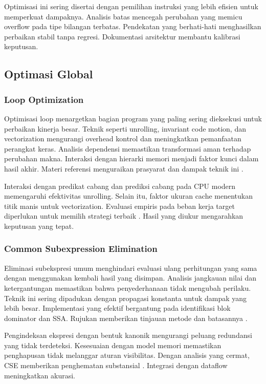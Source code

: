 \documentclass[../main.tex]{subfiles}
\begin{document}
Optimisasi ini sering disertai dengan pemilihan instruksi yang lebih efisien untuk memperkuat dampaknya. Analisis batas mencegah perubahan yang memicu overflow pada tipe bilangan terbatas. Pendekatan yang berhati-hati menghasilkan perbaikan stabil tanpa regresi. Dokumentasi arsitektur membantu kalibrasi keputusan.

\subsection{Optimasi Global}
\subsubsection{Loop Optimization}
Optimisasi loop menargetkan bagian program yang paling sering dieksekusi untuk perbaikan kinerja besar. Teknik seperti unrolling, invariant code motion, dan vectorization mengurangi overhead kontrol dan meningkatkan pemanfaatan perangkat keras. Analisis dependensi memastikan transformasi aman terhadap perubahan makna. Interaksi dengan hierarki memori menjadi faktor kunci dalam hasil akhir. Materi referensi menguraikan prasyarat dan dampak teknik ini \citep{WikiLoopOptimization}.

Interaksi dengan predikat cabang dan prediksi cabang pada CPU modern memengaruhi efektivitas unrolling. Selain itu, faktor ukuran cache menentukan titik manis untuk vectorization. Evaluasi empiris pada beban kerja target diperlukan untuk memilih strategi terbaik \citep{WikiLoopOptimization}. Hasil yang diukur mengarahkan keputusan yang tepat.

\subsubsection{Common Subexpression Elimination}
Eliminasi subekspresi umum menghindari evaluasi ulang perhitungan yang sama dengan menggunakan kembali hasil yang disimpan. Analisis jangkauan nilai dan ketergantungan memastikan bahwa penyederhanaan tidak mengubah perilaku. Teknik ini sering dipadukan dengan propagasi konstanta untuk dampak yang lebih besar. Implementasi yang efektif bergantung pada identifikasi blok dominator dan SSA. Rujukan memberikan tinjauan metode dan batasannya \citep{WikiCSE}.

Pengindeksan ekspresi dengan bentuk kanonik mengurangi peluang redundansi yang tidak terdeteksi. Kesesuaian dengan model memori memastikan penghapusan tidak melanggar aturan visibilitas. Dengan analisis yang cermat, CSE memberikan penghematan substansial \citep{WikiCSE}. Integrasi dengan dataflow meningkatkan akurasi.
\end{document}
